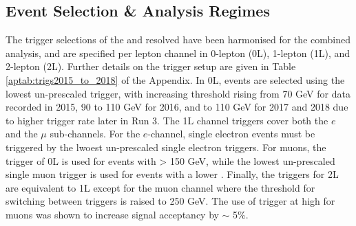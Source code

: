 \subsection{Event Selection \& Analysis Regimes}\label{sec-regimeCat}
The trigger selections of the \vhb and \vhc resolved have been harmonised for the combined analysis, and are specified per lepton channel in 0-lepton (0L), 1-lepton (1L), and 2-lepton (2L). Further details on the trigger setup are given in Table \ref{aptab:trigs2015_to_2018} of the Appendix. In 0L, events are selected using the lowest un-prescaled \etm trigger, with increasing threshold rising from 70 GeV for data recorded in 2015, 90 to 110 GeV for 2016, and to 110 GeV for 2017 and 2018 due to higher trigger rate later in Run 3. The 1L channel triggers cover both the $e$ and the $\mu$ sub-channels. For the $e$-channel, single electron events must be triggered by the lwoest un-prescaled single electron triggers. For muons, the \etm trigger of 0L is used for events with \ptv > 150 GeV, while the lowest un-prescaled single muon trigger is used for events with a lower \ptv. Finally, the triggers for 2L are equivalent to 1L except for the muon channel where the \ptv threshold for switching between triggers is raised to 250 GeV. The use of \etm trigger at high \ptv for muons was shown to increase signal acceptancy by $\sim$ 5\%.\\

